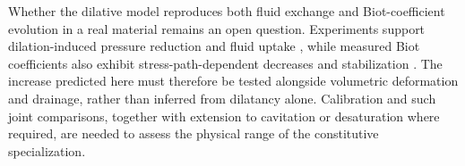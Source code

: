 Whether the dilative model reproduces both fluid exchange and Biot-coefficient
evolution in a real material remains an open question. Experiments support
dilation-induced pressure reduction and fluid uptake
\citep{makhnenkolabuz2015,brantut2020}, while measured Biot coefficients also
exhibit stress-path-dependent decreases and stabilization
\citep{ingraham2017evolution}. The increase predicted here must therefore be tested
alongside volumetric deformation and drainage, rather than inferred from
dilatancy alone. Calibration and such joint comparisons, together with
extension to cavitation or desaturation where required, are needed to assess
the physical range of the constitutive specialization.
